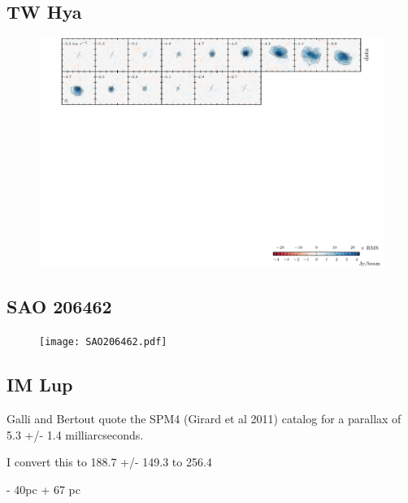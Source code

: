 \documentclass[twocolumn]{aastex6}
\begin{document}
\subsection{TW Hya}

\begin{figure}[htb]
\begin{center}
  \includegraphics{TWHya.pdf}
  \end{center}
\end{figure}

\subsection{SAO 206462}

\begin{figure}[htb]
\begin{center}
  \texttt{[image: SAO206462.pdf]}
  \end{center}
\end{figure}

\subsection{IM Lup}

Galli and Bertout quote the SPM4 (Girard et al 2011) catalog for a parallax of 5.3 +/- 1.4 milliarcseconds.

I convert this to 188.7 +/-
149.3 to 256.4

- 40pc + 67 pc
\end{document}
